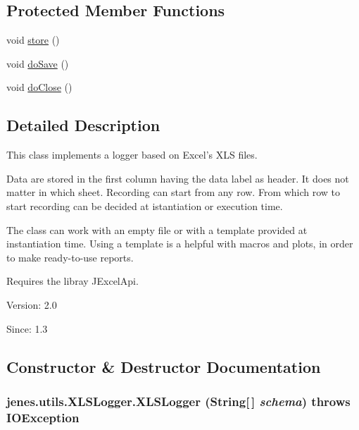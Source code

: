 \subsection*{Protected Member Functions}
\begin{CompactItemize}
\item 
void \hyperlink{classjenes_1_1utils_1_1_x_l_s_logger_e6b3840ad6be8bdc558efaf6077d4ae4}{store} ()
\item 
void \hyperlink{classjenes_1_1utils_1_1_x_l_s_logger_54c54393bf5a31442ebfc10517dfceea}{doSave} ()
\item 
void \hyperlink{classjenes_1_1utils_1_1_x_l_s_logger_cf58ddaa6873bcf626c9d24064a89b73}{doClose} ()
\end{CompactItemize}


\subsection{Detailed Description}
This class implements a logger based on Excel's XLS files.

Data are stored in the first column having the data label as header. It does not matter in which sheet. Recording can start from any row. From which row to start recording can be decided at istantiation or execution time.

The class can work with an empty file or with a template provided at instantiation time. Using a template is a helpful with macros and plots, in order to make ready-to-use reports.

Requires the libray JExcelApi.

\begin{Desc}
\item[Version:]2.0 \end{Desc}
\begin{Desc}
\item[Since:]1.3 \end{Desc}


\subsection{Constructor \& Destructor Documentation}
\hypertarget{classjenes_1_1utils_1_1_x_l_s_logger_1fa625f6c332aca9178b1c7a4eb963d8}{
\subsubsection[XLSLogger]{\setlength{\rightskip}{0pt plus 5cm}jenes.utils.XLSLogger.XLSLogger (String\mbox{[}$\,$\mbox{]} {\em schema})  throws IOException }}
\label{classjenes_1_1utils_1_1_x_l_s_logger_1fa625f6c332aca9178b1c7a4eb963d8}


